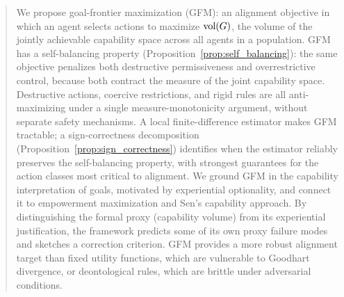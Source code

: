 %

\begin{abstract}
We propose goal-frontier maximization (GFM): an alignment objective in which an
    agent selects actions to maximize $\vol(G)$, the volume of the jointly
    achievable capability space across all agents in a population. GFM has a
    self-balancing property (Proposition~\ref{prop:self_balancing}): the same
    objective penalizes both destructive permissiveness and overrestrictive
    control, because both contract the measure of the joint capability space.
    Destructive actions, coercive restrictions, and rigid rules are all
    anti-maximizing under a single measure-monotonicity argument, without
    separate safety mechanisms. A local finite-difference estimator makes GFM
    tractable; a sign-correctness decomposition
    (Proposition~\ref{prop:sign_correctness}) identifies when the estimator
    reliably preserves the self-balancing property, with strongest guarantees
    for the action classes most critical to alignment. We ground GFM in the
    capability interpretation of goals, motivated by experiential optionality,
    and connect it to empowerment maximization and Sen's capability approach.
    By distinguishing the formal proxy (capability volume) from its
    experiential justification, the framework predicts some of its own proxy
    failure modes and sketches a correction criterion. GFM provides a more
    robust alignment target than fixed utility functions, which are vulnerable
    to Goodhart divergence, or deontological rules, which are brittle under
    adversarial conditions.
\end{abstract}
